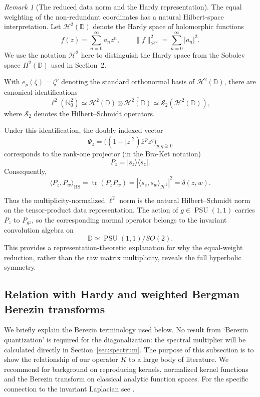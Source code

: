 \IfFileExists{iopjournal.cls}{\documentclass{iopjournal}}{\documentclass{iopjournal-draft}}
\theoremstyle{definition}
\theoremstyle{remark}
\newtheorem{remark}[theorem]{Remark}
\newcommand{\D}{\mathbb D}
\newcommand{\norm}[1]{\lVert #1\rVert}
\newcommand{\N}{\mathbb N}
\numberwithin{equation}{section}
\begin{document}
\begin{remark}[The reduced data norm and the Hardy representation]
	The equal weighting of the non-redundant coordinates has a natural
	Hilbert-space interpretation. Let $\mathcal H^2(\D)$ denote the Hardy space of holomorphic functions
	\[
	f(z)=\sum_{n=0}^{\infty}a_nz^n,
	\qquad
	\norm{f}_{\mathcal H^2}^2=\sum_{n=0}^{\infty}|a_n|^2.
	\]
	We use the notation $\mathcal H^2$ here to distinguish the Hardy space
	from the Sobolev space $H^2(\D)$ used in Section~2.
	
	
	 With $e_p(\zeta)=\zeta^p$ denoting the
	standard orthonormal basis of $\mathcal{H}^2(\D)$, there are canonical
	identifications
	\[
	\ell^2(\N_0^2)
	\simeq
	\mathcal{H}^2(\D)\otimes\overline{\mathcal{H}^2(\D)}
	\simeq
	\mathcal S_2(\mathcal{H}^2(\D)),
	\]
	where $\mathcal S_2$ denotes the Hilbert--Schmidt operators.
	
	Under this identification, the doubly indexed vector
	\[
	\Psi_z
	=
	\bigl((1-|z|^2)\overline z^{\,p}z^q\bigr)_{p,q\geq0}
	\]
	corresponds to the rank-one projector (in the Bra-Ket notation)
	\[
	P_z=|s_z\rangle\langle s_z|.
	\]
	Consequently,
	\[
	\langle P_z,P_w\rangle_{\mathrm{HS}}
	=
	\operatorname{tr}(P_zP_w)
	=
	|\langle s_z,s_w\rangle_{\mathcal{H}^2}|^2
	=
	\delta(z,w).
	\]
	
	Thus the multiplicity-normalized $\ell^2$ norm is the natural
	Hilbert--Schmidt norm on the tensor-product data representation.
	The action of $g\in \operatorname{PSU}(1,1)$ carries $P_z$ to $P_{gz}$,
	so the corresponding normal operator belongs to the invariant
	convolution algebra on
	\[
	\D\simeq\operatorname{PSU}(1,1)/SO(2).
	\]
	This provides a representation-theoretic explanation for why the
	equal-weight reduction, rather than the raw matrix multiplicity,
	reveals the full hyperbolic symmetry.
\end{remark}


\subsection{Relation with Hardy and weighted Bergman Berezin transforms}\label{sec:berezin}

We briefly explain the Berezin terminology used below.  No result from
`Berezin quantization' is required for the diagonalization: the spectral
multiplier will be calculated directly in Section~\ref{sec:spectrum}. The purpose of this subsection is to show the relationship of our operator $K$ to a large body of literature. We recommend \cite{Stroethoff1997} for background on reproducing kernels, normalized kernel functions and the Berezin transform on classical analytic function spaces. For the specific connection to the invariant Laplacian see \cite{Englis1995}. 
\end{document}
